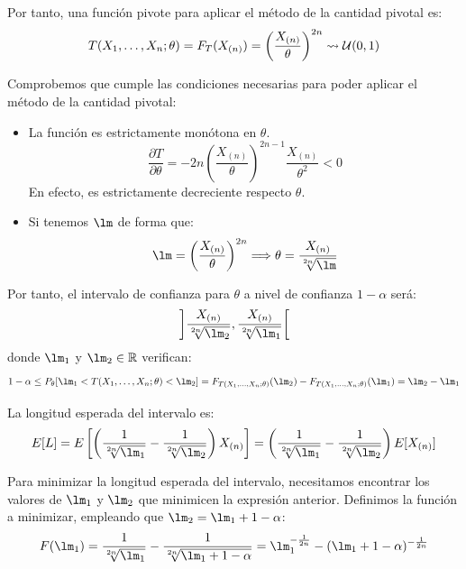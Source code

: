 \begin{ejercicio}
    Por tanto, una función pivote para aplicar el método de la cantidad pivotal es:
    \begin{equation*}
        T(X_1, \ldots, X_n;\theta) = F_T(X_{(n)}) = {\left(\frac{X_{(n)}}{\theta}\right)}^{2n} \rightsquigarrow \mathcal{U}(0,1)
    \end{equation*}
    
    Comprobemos que cumple las condiciones necesarias para poder aplicar el método de la cantidad pivotal:
    \begin{itemize}
        \item La función es estrictamente monótona en $\theta$.
        \begin{equation*}
            \frac{\partial T}{\partial \theta} = -2n{\left(\frac{X_{(n)}}{\theta}\right)}^{2n-1}\frac{X_{(n)}}{\theta^2} < 0
        \end{equation*}
        En efecto, es estrictamente decreciente respecto $\theta$.

        \item Si tenemos $\lm$ de forma que:
            \begin{equation*}
                \lm = {\left(\frac{X_{(n)}}{\theta}\right)}^{2n} \Longrightarrow \theta = \frac{X_{(n)}}{\sqrt[2n]{\lm}}
            \end{equation*}
    \end{itemize}

    Por tanto, el intervalo de confianza para $\theta$ a nivel de confianza $1-\alpha$ será:
    \begin{equation*}
        \left]\frac{X_{(n)}}{\sqrt[2n]{\lm_2}},\frac{X_{(n)}}{\sqrt[2n]{\lm_1}} \right[
    \end{equation*}
    donde $\lm_1$ y $\lm_2\in \bb{R}$ verifican:
    \begin{equation*}
        1-\alpha\leq P_\theta[\lm_1<T(X_1, \ldots, X_n;\theta)<\lm_2] = F_{T(X_1, \ldots, X_n;\theta)}(\lm_2) - F_{T(X_1, \ldots, X_n;\theta)}(\lm_1) = \lm_2-\lm_1
    \end{equation*}

    La longitud esperada del intervalo es:
    \begin{equation*}
        E[L] = E\left[\left(\frac{1}{\sqrt[2n]{\lm_1}} - \frac{1}{\sqrt[2n]{\lm_2}}\right) X_{(n)}\right] = \left(\frac{1}{\sqrt[2n]{\lm_1}} - \frac{1}{\sqrt[2n]{\lm_2}}\right)E[X_{(n)}]
    \end{equation*}

    Para minimizar la longitud esperada del intervalo, necesitamos encontrar los valores de $\lm_1$ y $\lm_2$ que minimicen la expresión anterior. Definimos la función a minimizar, empleando que $\lm_2 = \lm_1 + 1 - \alpha$:
    \begin{equation*}
        F(\lm_1) = \frac{1}{\sqrt[2n]{\lm_1}} - \frac{1}{\sqrt[2n]{\lm_1 + 1 - \alpha}} = \lm_1^{-\frac{1}{2n}} - (\lm_1 + 1 - \alpha)^{-\frac{1}{2n}}
    \end{equation*}


\end{ejercicio}

